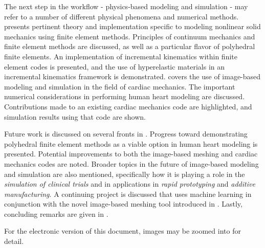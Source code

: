 The next step in the workflow - physics-based modeling and simulation - may refer to a number of different physical phenomena and numerical methods.  presents pertinent theory and implementation specific to modeling nonlinear solid mechanics using finite element methods. Principles of continuum mechanics and finite element methods are discussed, as well as a particular flavor of polyhedral finite elements. An implementation of incremental kinematics within finite element codes is presented, and the use of hyperelastic materials in an incremental kinematics framework is demonstrated.  covers the use of image-based modeling and simulation in the field of cardiac mechanics. The important numerical considerations in performing human heart modeling are discussed. Contributions made to an existing cardiac mechanics code are highlighted, and simulation results using that code are shown.

Future work is discussed on several fronts in . Progress toward demonstrating polyhedral finite element methods as a viable option in human heart modeling is presented. Potential improvements to both the image-based meshing and cardiac mechanics codes are noted. Broader topics in the future of image-based modeling and simulation are also mentioned, specifically how it is playing a role in the \textit{simulation of clinical trials} and in applications in \textit{rapid prototyping} and \textit{additive manufacturing}. A continuing project is discussed that uses machine learning in conjunction with the novel image-based meshing tool introduced in . Lastly, concluding remarks are given in .

For the electronic version of this document, images may be zoomed into for detail.
